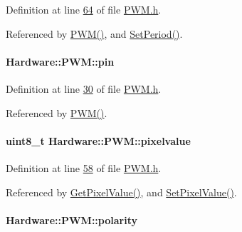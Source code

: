 Definition at line \hyperlink{_p_w_m_8h_source_l00064}{64} of file \hyperlink{_p_w_m_8h_source}{P\+W\+M.\+h}.



Referenced by \hyperlink{_p_w_m_8cpp_source_l00015}{P\+W\+M()}, and \hyperlink{_p_w_m_8cpp_source_l00114}{Set\+Period()}.

\hypertarget{class_hardware_1_1_p_w_m_a47a155962c7c376bf1fe27c15c1e1e1d}{}
\paragraph[{pin}]{ Hardware\+::\+P\+W\+M\+::pin}\label{class_hardware_1_1_p_w_m_a47a155962c7c376bf1fe27c15c1e1e1d}


Definition at line \hyperlink{_p_w_m_8h_source_l00030}{30} of file \hyperlink{_p_w_m_8h_source}{P\+W\+M.\+h}.



Referenced by \hyperlink{_p_w_m_8cpp_source_l00015}{P\+W\+M()}.

\hypertarget{class_hardware_1_1_p_w_m_a27de0bd1068a57a970d21bbbe4fc0872}{}
\paragraph[{pixelvalue}]{\setlength{\rightskip}{0pt plus 5cm}uint8\+\_\+t Hardware\+::\+P\+W\+M\+::pixelvalue\hspace{0.3cm}{\ttfamily [private]}}\label{class_hardware_1_1_p_w_m_a27de0bd1068a57a970d21bbbe4fc0872}


Definition at line \hyperlink{_p_w_m_8h_source_l00058}{58} of file \hyperlink{_p_w_m_8h_source}{P\+W\+M.\+h}.



Referenced by \hyperlink{_p_w_m_8h_source_l00032}{Get\+Pixel\+Value()}, and \hyperlink{_p_w_m_8cpp_source_l00102}{Set\+Pixel\+Value()}.

\hypertarget{class_hardware_1_1_p_w_m_ad346586d086f8462c3de6a4c19edb1d3}{}
\paragraph[{polarity}]{ Hardware\+::\+P\+W\+M\+::polarity\hspace{0.3cm}{\ttfamily [private]}}\label{class_hardware_1_1_p_w_m_ad346586d086f8462c3de6a4c19edb1d3}


